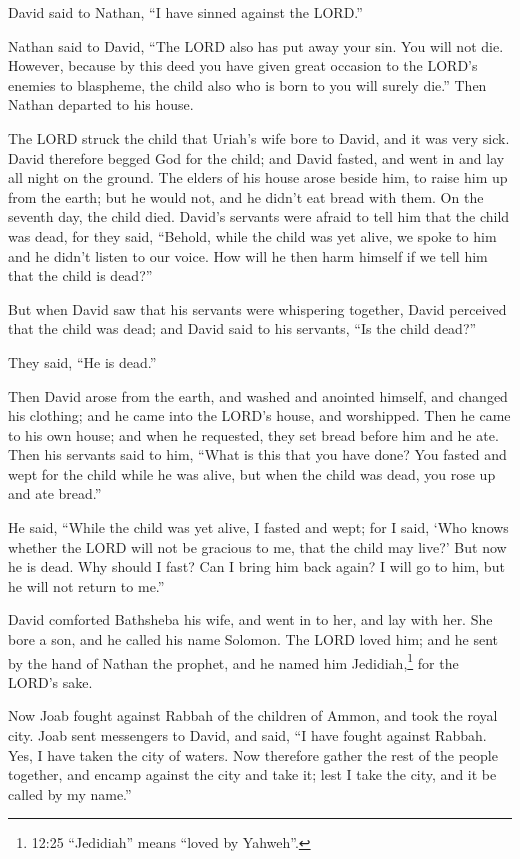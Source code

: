 David said to Nathan, ``I have sinned against the LORD.''

Nathan said to David, ``The LORD also has put away your sin. You will
not die.  However, because by this deed you have given
great occasion to the LORD's enemies to blaspheme, the child also who is
born to you will surely die.''  Then Nathan departed to his
house.

The LORD struck the child that Uriah's wife bore to David, and it was
very sick.  David therefore begged God for the child; and
David fasted, and went in and lay all night on the ground. 
The elders of his house arose beside him, to raise him up from the
earth; but he would not, and he didn't eat bread with them.
 On the seventh day, the child died. David's servants were
afraid to tell him that the child was dead, for they said, ``Behold,
while the child was yet alive, we spoke to him and he didn't listen to
our voice. How will he then harm himself if we tell him that the child
is dead?''

 But when David saw that his servants were whispering
together, David perceived that the child was dead; and David said to his
servants, ``Is the child dead?''

They said, ``He is dead.''

 Then David arose from the earth, and washed and anointed
himself, and changed his clothing; and he came into the LORD's house,
and worshipped. Then he came to his own house; and when he requested,
they set bread before him and he ate.  Then his servants
said to him, ``What is this that you have done? You fasted and wept for
the child while he was alive, but when the child was dead, you rose up
and ate bread.''

 He said, ``While the child was yet alive, I fasted and
wept; for I said, `Who knows whether the LORD will not be gracious to
me, that the child may live?'  But now he is dead. Why
should I fast? Can I bring him back again? I will go to him, but he will
not return to me.''

 David comforted Bathsheba his wife, and went in to her,
and lay with her. She bore a son, and he called his name Solomon. The
LORD loved him;  and he sent by the hand of Nathan the
prophet, and he named him Jedidiah,\footnote{12:25 ``Jedidiah'' means
  ``loved by Yahweh''.} for the LORD's sake.

 Now Joab fought against Rabbah of the children of Ammon,
and took the royal city.  Joab sent messengers to David,
and said, ``I have fought against Rabbah. Yes, I have taken the city of
waters.  Now therefore gather the rest of the people
together, and encamp against the city and take it; lest I take the city,
and it be called by my name.''

